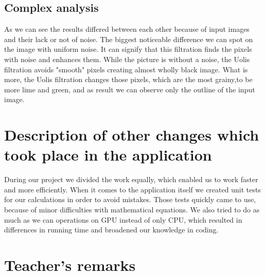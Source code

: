 \documentclass[12pt]{article}
\begin{document}
\subsection{Complex analysis}

As we can see the results differed between each other because of input images and their lack or not of noise. The biggest noticeable difference we can spot on the image with uniform noise. It can signify that this filtration finds the pixels with noise and enhances them. While the picture is without a noise, the Uolis filtration avoids "smooth" pixels creating almost wholly black image. What is more, the Uolis filtration changes those pixels, which are the most grainy,to be more lime and green, and as result we can observe only the outline of the input image.

\section{Description of other changes which took place in the application}

During our project we divided the work equally,
which enabled us to work faster and more efficiently.
When it comes to the application itself we created unit tests for our calculations in order to avoid mistakes.
Those tests quickly came to use, because of minor difficulties with mathematical equations.
We also tried to do as much as we can operations on GPU instead of only CPU,
which resulted in differences in running time and broadened our knowledge in coding.


\vfill
\section*{Teacher's remarks}
\begin{tabularx}{\textwidth}{|X|}
    \hline
    \vspace{7cm}
    \phantom{.} \\
    \hline
\end{tabularx}
\end{document}
